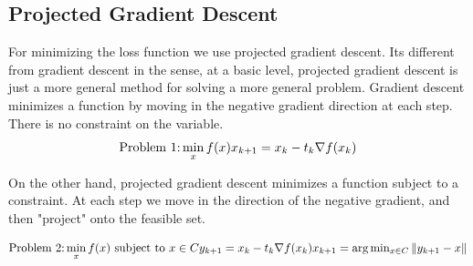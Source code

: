 \subsection{Projected Gradient Descent} %
\label{sub:projected_gradient_descent}
	For minimizing the loss function we use projected gradient descent. Its different from gradient descent in the sense, at a basic level, projected gradient descent is just a more general method for solving a more general problem. Gradient descent minimizes a function by moving in the negative gradient direction at each step. There is no constraint on the variable. 
\begin{equation} \label{eqn:gradient_descent}
\text{Problem 1:} \min_x f(x)
$$
$$
x_{k+1} = x_k - t_k \nabla f(x_k)
\end{equation}

On the other hand, projected gradient descent minimizes a function subject to a constraint. At each step we move in the direction of the negative gradient, and then "project" onto the feasible set.

\begin{equation} \label{eqn:projected_gradient_descent}
\text{Problem 2:} \min_x f(x) \text{ subject to } x \in C
$$
$$
y_{k+1} = x_k - t_k \nabla f(x_k)
$$
$$
x_{k+1} = \text{arg} \min_{x \in C} \|y_{k+1}-x\| 
\end{equation}


